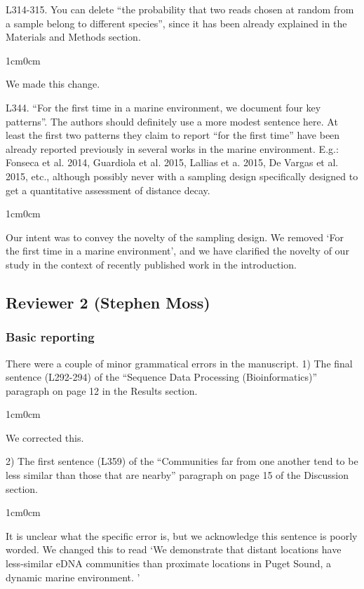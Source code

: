 \documentclass{article}
\newenvironment{response}
	{
	\begin{adjustwidth}{1cm}{0cm}
	\color{peerjBlue}
	}
	{
	\end{adjustwidth}
	}
\begin{document}
L314-315. You can delete ``the probability that two reads chosen at random from a sample belong to different species'', since it has been already explained in the Materials and Methods section.
\begin{response}
  We made this change.\\
\end{response}

L344. ``For the first time in a marine environment, we document four key patterns''. The authors should definitely use a more modest sentence here. At least the first two patterns they claim to report ``for the first time'' have been already reported previously in several works in the marine environment. E.g.: Fonseca et al. 2014, Guardiola et al. 2015, Lallias et a. 2015, De Vargas et al. 2015, etc., although possibly never with a sampling design specifically designed to get a quantitative assessment of distance decay.
\begin{response}
  Our intent was to convey the novelty of the sampling design.
	We removed `For the first time in a marine environment', and we have clarified the novelty of our study in the context of recently published work in the introduction.\\
\end{response}



\subsection*{Reviewer 2 (Stephen Moss)}
\subsubsection*{Basic reporting}
There were a couple of minor grammatical errors in the manuscript. 1) The final sentence (L292-294) of the ``Sequence Data Processing (Bioinformatics)'' paragraph on page 12 in the Results section.
\begin{response}
  We corrected this.\\
\end{response}

2) The first sentence (L359) of the ``Communities far from one another tend to be less similar than those that are nearby'' paragraph on page 15 of the Discussion section.
\begin{response}
  It is unclear what the specific error is, but we acknowledge this sentence is poorly worded.
	We changed this to read `We demonstrate that distant locations have less-similar eDNA communities than proximate locations in Puget Sound, a dynamic marine environment. '\\
\end{response}
\end{document}
